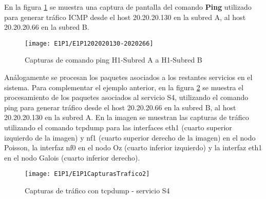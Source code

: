 En la figura \ref{fig:LabE1P1CapHost} se muestra una captura de pantalla del comando \textbf{Ping} utilizado para generar tr\'afico ICMP desde el host 20.20.20.130 en la subred A, al host 20.20.20.66 en la subred B.\\

\begin{figure}[h!] 
\centering    
\texttt{[image: E1P1/E1P1202020130-2020266]}
\caption[Capturas de comando ping H1-Subred A]{Capturas de comando ping H1-Subred A a H1-Subred B}
\label{fig:LabE1P1CapHost}
\end{figure}

Análogamente se procesan los paquetes asociados a los restantes servicios en el sistema. Para complementar el ejemplo anterior, en la figura \ref{fig:LabE1P1CapsTraf2} se muestra el procesamiento de los paquetes asociados al servicio S4, utilizando el comando ping para generar tr\'afico desde el host 20.20.20.66 en la subred B, al host 20.20.20.130 en la subred A. En la imagen se muestran las capturas de tr\'afico utilizando el comando tcpdump para las interfaces eth1 (cuarto superior izquierdo de la imagen) y nf1 (cuarto superior derecho de la imagen) en el nodo Poisson, la interfaz nf0 en el nodo Oz (cuarto inferior izquierdo) y la interfaz eth1 en el nodo Galois (cuarto inferior derecho).\\


\begin{figure}[h!] 
\centering    
\texttt{[image: E1P1/E1P1CapturasTrafico2]}
\caption[Capturas de tr\'afico con tcpdump - servicio S4]{Capturas de tr\'afico con tcpdump - servicio S4}
\label{fig:LabE1P1CapsTraf2}
\end{figure}




